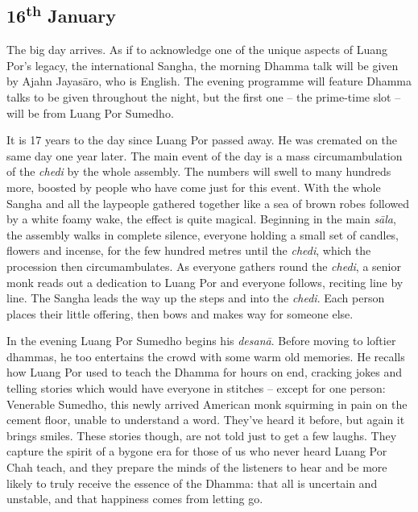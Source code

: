 \subsection*{16\textsuperscript{th} January}

The big day arrives. As if to acknowledge one of
the unique aspects of Luang Por's legacy, the international Sangha, the
morning Dhamma talk will be given by Ajahn Jayasāro, who is English. The
evening programme will feature Dhamma talks to be given throughout the
night, but the first one -- the prime-time slot -- will be from Luang
Por Sumedho. 

It is 17 years to the day since Luang Por passed away. He was
cremated on the same day one year later. The main event of the day is a
mass circumambulation of the \emph{chedi} by the whole assembly. The
numbers will swell to many hundreds more, boosted by people who have
come just for this event. With the whole Sangha and all the laypeople
gathered together like a sea of brown robes followed by a white foamy
wake, the effect is quite magical. Beginning in the main \emph{sāla}, 
the assembly walks in complete silence, everyone holding a small set of
candles, flowers and incense, for the few hundred metres until the
\emph{chedi}, which the procession then circumambulates. As everyone
gathers round the \emph{chedi}, a senior monk reads out a dedication to
Luang Por and everyone follows, reciting line by line. The Sangha leads
the way up the steps and into the \emph{chedi}. Each person places their
little offering, then bows and makes way for someone else. 

In the evening Luang Por Sumedho begins his \emph{desanā}. Before moving
to loftier dhammas, he too entertains the crowd with some warm old
memories. He recalls how Luang Por used to teach the Dhamma for hours on
end, cracking jokes and telling stories which would have everyone in
stitches -- except for one person: Venerable Sumedho, this newly arrived
American monk squirming in pain on the cement floor, unable to
understand a word. They've heard it before, but again it brings smiles. 
These stories though, are not told just to get a few laughs. They
capture the spirit of a bygone era for those of us who never heard Luang
Por Chah teach, and they prepare the minds of the listeners to hear and
be more likely to truly receive the essence of the Dhamma: that all is
uncertain and unstable, and that happiness comes from letting go. 

